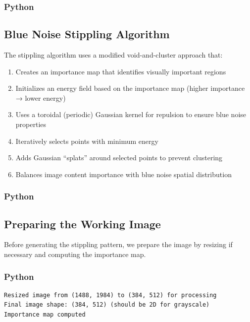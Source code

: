\documentclass[
  letterpaper,
  DIV=11,
  numbers=noendperiod]{scrartcl}
\providecommand{\tightlist}{%
  \setlength{\itemsep}{0pt}\setlength{\parskip}{0pt}}
\begin{document}
\subsubsection{Python}

\subsection{Blue Noise Stippling
Algorithm}\label{blue-noise-stippling-algorithm}

The stippling algorithm uses a modified void-and-cluster approach that:

\begin{enumerate}
\def\labelenumi{\arabic{enumi}.}
\tightlist
\item
  Creates an importance map that identifies visually important regions
\item
  Initializes an energy field based on the importance map (higher
  importance → lower energy)
\item
  Uses a toroidal (periodic) Gaussian kernel for repulsion to ensure
  blue noise properties
\item
  Iteratively selects points with minimum energy
\item
  Adds Gaussian ``splats'' around selected points to prevent clustering
\item
  Balances image content importance with blue noise spatial distribution
\end{enumerate}

\subsubsection{Python}

\subsection{Preparing the Working
Image}\label{preparing-the-working-image}

Before generating the stippling pattern, we prepare the image by
resizing if necessary and computing the importance map.

\subsubsection{Python}

\label{prep-image}
\begin{verbatim}
Resized image from (1488, 1984) to (384, 512) for processing
Final image shape: (384, 512) (should be 2D for grayscale)
Importance map computed
\end{verbatim}
\end{document}
